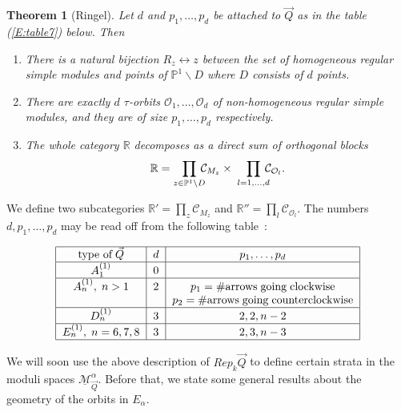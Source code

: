 \documentclass[a4paper,10pt]{amsart}
\def\a{\alpha}
\def\Ma{\underline{\mathcal{M}}^{\alpha}_{\vec{Q}}}
\newtheorem{theo}{\bf{Theorem}}[section]
\numberwithin{equation}{section}
\begin{document}
\begin{theo}[Ringel]\label{T:Ringelstructure} Let $d$ and $p_1, \ldots, p_d$ be attached to $\vec{Q}$ as in the table (\ref{E:table7}) below. Then
\begin{enumerate}
\item[i)] There is a natural bijection $R_z \leftrightarrow z$ between the set of homogeneous regular simple modules and points of $\mathbb{P}^1 \backslash D$ where $D$ consists of $d$ points.
\item[ii)] There are exactly $d$ $\tau$-orbits $\mathcal{O}_1, \ldots, \mathcal{O}_d$ of non-homogeneous regular simple modules, and they are of size $p_1, \ldots, p_d$ respectively.
\item[iii)] The whole category $\mathbb{R}$ decomposes as a direct sum of orthogonal blocks
$$\mathbb{R} = \prod_{z \in \mathbb{P}^1\backslash D} \hspace{-.08in}\mathcal{C}_{M_z} \times\; \prod_{l=1, \ldots, d}\hspace{-.08in} \mathcal{C}_{\mathcal{O}_l}.$$
\end{enumerate}
\end{theo}

\vspace{.1in}

We define two subcategories $\mathbb{R}'=\prod_{z} \mathcal{C}_{M_z}$ and $\mathbb{R}''=\prod_{l} \mathcal{C}_{\mathcal{O}_l}$. The numbers $d, p_1, \ldots, p_d$ may be read off from the following table~:

\vspace{.15in}

\begin{equation}\label{E:table7}
\begin{tabular}{|c|c|c|}
\hline
type of\;$\vec{Q}$ & $d$ & $p_1, \ldots, p_d$\\
\hline
$A_1^{(1)}$ & 0 & \\
\hline
$A_n^{(1)}, \;n>1$ & 2 & $p_1=\# \mathrm{arrows\;going\;clockwise}$\\
& & $p_2=\# \mathrm{arrows\;going\;counterclockwise}$\\
\hline
$D_n^{(1)}$ & 3 & $2,2,n-2$\\
\hline
$E_n^{(1)},\; n=6,7,8$ & 3 & $2,3,n-3$\\
\hline
\end{tabular} 
\end{equation}

\vspace{.2in}

We will soon use the above description of $Rep_k\vec{Q}$ to define certain strata in the moduli spaces $\Ma$.  Before that, we state some general results about the geometry of the orbits in $E_{\a}$.
\end{document}
